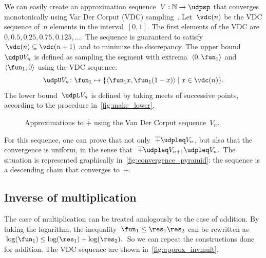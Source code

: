 We can easily create an approximation sequence~$V:\mathbb{N}\rightarrow\udpsp$
that converges monotonically using Var Der Corput (VDC) sampling~\cite[Section 5.2]{LaValle2006Planning}.
Let~$\vdc(n)$ be the VDC sequence of~$n$ elements in the interval~$[0,1]$.
The first elements of the VDC are $0,0.5,0.25,0.75,0.125,\dots$.
The sequence is guaranteed to satisfy~$\vdc(n)\subseteq\vdc(n+1)$
and to minimize the discrepancy. The upper bound~$\udpU V_{n}$
is defined as sampling the segment with extrema~$\left\langle 0,\fun_{1}\right\rangle $
and~$\left\langle \fun_{1},0\right\rangle $ using the VDC sequence:
\[
    \udpU V_{n}\colon\fun_{1}\mapsto\{\left\langle \fun_{1}x,\fun_{1}(1-x)\right\rangle \mid x\in\vdc(n)\}.
\]
The lower bound~$\udpL V_{n}$ is defined by taking meets of successive
points, according to the procedure in~\cref{fig:make_lower}.
\begin{center}
    \begin{figure}[h]
        \begin{centering}
            \par
        \end{centering}
        \caption{\label{fig:Vn}Approximations to $\overline{+}$ using the Van Der
        Corput sequence~$V_{n}$.}
    \end{figure}
    \par
\end{center}

For this sequence, one can prove that not only~$\overline{+}\udpleq V_{n}$,
but also that the convergence is uniform, in the sense that~$\overline{+}\udpleq V_{n+1}\udpleq V_{n}.$
The situation is represented graphically in~\cref{fig:convergence_pyramid}:
the sequence is a descending chain that converges to~$\overline{+}$.

\subsection{Inverse of multiplication}

The case of multiplication can be treated analogously to the case
of addition. By taking the logarithm, the inequality~$\fun_{1}\leq\res_{1}\res_{2}$
can be rewritten as~$\log(\fun_{1})\leq\log(\res_{1})+\log(\res_{2}).$
So we can repeat the constructions done for addition. The VDC sequence
are shown in~\cref{fig:approx_invmult}.

